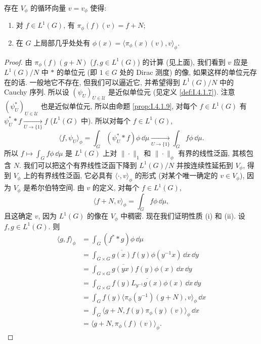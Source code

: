 \begin{lemma}[循环向量]
\label{lem:III.2.7}
存在 $V_{\phi}$ 的循环向量 $v = v_{\phi}$ 使得:
\begin{enumerate}
\item[(i)] 对 $f \in L^1(G)$, 有 $\pi_{\phi}(f)(v) = f + N$;
\item[(ii)] 在 $G$ 上局部几乎处处有 $\phi(x) = \langle \pi_{\phi}(x)(v), v \rangle_{\phi}$.
\end{enumerate}
\end{lemma}

\begin{proof}
由 $\pi_{\phi}(f)(g + N)$ ($f, g \in L^1(G)$) 的计算 (见上面), 我们看到 $v$ 应是 $L^1(G)/N$ 中 $*$ 的单位元 (即 $1 \in G$ 处的 Dirac 测度) 的像, 如果这样的单位元存在的话. 一般地它不存在, 但我们可以逼近它, 并希望得到 $L^1(G)/N$ 中的 Cauchy 序列.
所以设 $(\psi_U)_{U \in \mathcal{U}}$ 是近似单位元 (见定义 \ref{def:I.4.1.7}). 注意 $(\psi_U^*)_{U \in \mathcal{U}}$ 也是近似单位元, 所以由命题 \ref{prop:I.4.1.9}, 对每个 $f \in L^1(G)$ 有 $\psi_U^* * f \xrightarrow[U \to \{1\}]{} f$ ($L^1(G)$ 中). 所以对每个 $f \in L^1(G)$,
\[
\langle f, \psi_U \rangle_{\phi} = \int_G (\psi_U^* * f)\phi\,\dd\mu \xrightarrow[U \to \{1\}]{} \int_G f\phi\,\dd\mu.
\]
所以 $f \longmapsto \int_G f\phi\,\dd\mu$ 是 $L^1(G)$ 上对 $\|\cdot\|_1$ 和 $\|\cdot\|_{\phi}$ 有界的线性泛函, 其核包含 $N$. 我们可以把这个有界线性泛函下降到 $L^1(G)/N$ 并按连续性延拓到 $V_{\phi}$, 得到 $V_{\phi}$ 上的有界线性泛函, 它必具有 $\langle \cdot, v \rangle_{\phi}$ 的形式 (对某个唯一确定的 $v \in V_{\phi}$), 因为 $V_{\phi}$ 是希尔伯特空间. 由 $v$ 的定义, 对每个 $f \in L^1(G)$,
\[
\langle f + N, v \rangle_{\phi} = \int_G f\phi\,\dd\mu,
\]
且这确定 $v$, 因为 $L^1(G)$ 的像在 $V_{\phi}$ 中稠密.
现在我们证明性质 (i) 和 (ii). 设 $f, g \in L^1(G)$. 则
\begin{align*}
\langle g, f \rangle_{\phi} &= \int_G (f^* * g)\phi\,\dd\mu \\
&= \int_{G \times G}\overline{g(x)}f(y)\phi(y^{-1}x)\,\dd x\,\dd y \\
&= \int_{G \times G}\overline{g(yx)}f(y)\phi(x)\,\dd x\,\dd y \\
&= \int_{G \times G}f(y)\overline{L_{y^{-1}}g(x)}\phi(x)\,\dd x\,\dd y \\
&= \int_G f(y)\langle \pi_{\phi}(y^{-1})(g + N), v \rangle_{\phi}\,\dd x \\
&= \int_G \langle g + N, f(y)\pi_{\phi}(y)(v) \rangle_{\phi}\,\dd x \\
&= \langle g + N, \pi_{\phi}(f)(v) \rangle_{\phi}.
\end{align*}

\end{proof}
